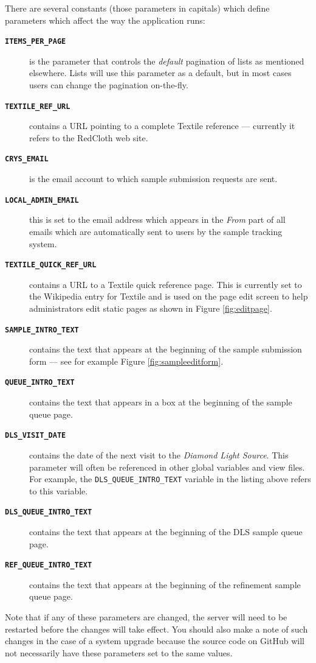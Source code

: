 \documentclass[12pt,twoside]{article}
\begin{document}
There are several constants (those parameters in capitals) which define
parameters which affect the way the application runs:
\begin{description}
\item[\texttt{\textbf{ITEMS\_PER\_PAGE}}]
is the parameter that controls the \emph{default} pagination of lists
as mentioned elsewhere. Lists will use this parameter as a default, but
in most cases users can change the pagination on-the-fly.
\item[\texttt{\textbf{TEXTILE\_REF\_URL}}]
contains a URL pointing to a complete Textile reference --- currently
it refers to the RedCloth web site.
\item[\texttt{\textbf{CRYS\_EMAIL}}]
is the email account to which sample submission requests are sent.
\item[\texttt{\textbf{LOCAL\_ADMIN\_EMAIL}}]
this is set to the email address which appears in the \emph{From}
part of all emails which are automatically sent to users by the sample
tracking system.
\item[\texttt{\textbf{TEXTILE\_QUICK\_REF\_URL}}]
contains a URL to a Textile quick reference page. This is currently set
to the Wikipedia entry for Textile and is used on the page edit screen
to help administrators edit static pages as shown in Figure \ref{fig:editpage}.
\item[\texttt{\textbf{SAMPLE\_INTRO\_TEXT}}]
contains the text that appears at the beginning of the sample
submission form --- see for example Figure \ref{fig:sampleeditform}. 
\item[\texttt{\textbf{QUEUE\_INTRO\_TEXT}}]
contains the text that appears in a box at the beginning of the sample
queue page.
\item[\texttt{\textbf{DLS\_VISIT\_DATE}}]
contains the date of the next visit to the \emph{Diamond Light Source}. This
parameter will often be referenced in other global variables and view files.
For example, the \verb=DLS_QUEUE_INTRO_TEXT= variable in the listing above
refers to this variable.
\item[\texttt{\textbf{DLS\_QUEUE\_INTRO\_TEXT}}]
contains the text that appears at the beginning of the DLS sample
queue page.
\item[\texttt{\textbf{REF\_QUEUE\_INTRO\_TEXT}}]
contains the text that appears at the beginning of the refinement sample
queue page.
\end{description}

\begin{plainblock}
Note that if any of these parameters are changed, the server will need
to be restarted before the changes will take effect. You should also
make a note of such changes in the case of a system upgrade because
the source code on GitHub will not necessarily have these parameters
set to the same values.
\end{plainblock}
\end{document}
